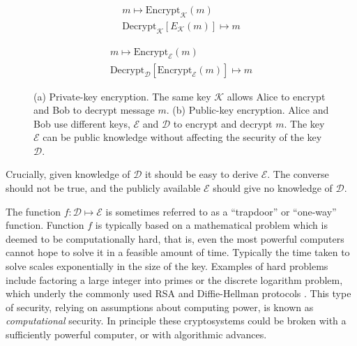 \begin{figure}[htp]
\centering
\captionsetup{width=0.8\linewidth}
\begin{framed}
\begin{subfigure}{0.4\textwidth}
\begin{align*}
m \mapsto \text{Encrypt}_\mathcal{K}\left(m\right) \\
\text{Decrypt}_\mathcal{K}\left[E_\mathcal{K}\left(m\right)\right] \mapsto m
\end{align*}
\caption{}
\end{subfigure}
\begin{subfigure}{0.4\textwidth}
\begin{align*}
m \mapsto \text{Encrypt}_\mathcal{E}\left(m\right) \\
\text{Decrypt}_\mathcal{D}\left[\text{Encrypt}_\mathcal{E}\left(m\right)\right] \mapsto m
\end{align*}
\caption{}
\end{subfigure}
\caption{(a) Private-key encryption. The same key $\mathcal{K}$ allows Alice to encrypt and Bob to decrypt message $m$. (b) Public-key encryption. Alice and Bob use different keys, $\mathcal{E}$ and $\mathcal{D}$ to encrypt and decrypt $m$. The key $\mathcal{E}$ can be public knowledge without affecting the security of the key $\mathcal{D}$.}
\label{fig:pubpriv}
\end{framed}
\end{figure}

Crucially, given knowledge of $\mathcal{D}$ it should be easy to derive $\mathcal{E}$. The converse should not be true, and the publicly available $\mathcal{E}$ should give no knowledge of $\mathcal{D}$. %

The function $f: \mathcal{D} \mapsto \mathcal{E}$ is sometimes referred to as a ``trapdoor'' or ``one-way'' function. Function $f$ is typically based on a mathematical problem which is deemed to be computationally hard, that is, even the most powerful computers cannot hope to solve it in a feasible amount of time. Typically the time taken to solve scales exponentially in the size of the key. Examples of hard problems include factoring a large integer into primes or the discrete logarithm problem, which underly the commonly used RSA  and Diffie-Hellman protocols \cite{Rivest1978, Diffie1976, Schneier1996}. This type of security, relying on assumptions about computing power, is known as \emph{computational} security. In principle these cryptosystems could be broken with a sufficiently powerful computer, or with algorithmic advances.

